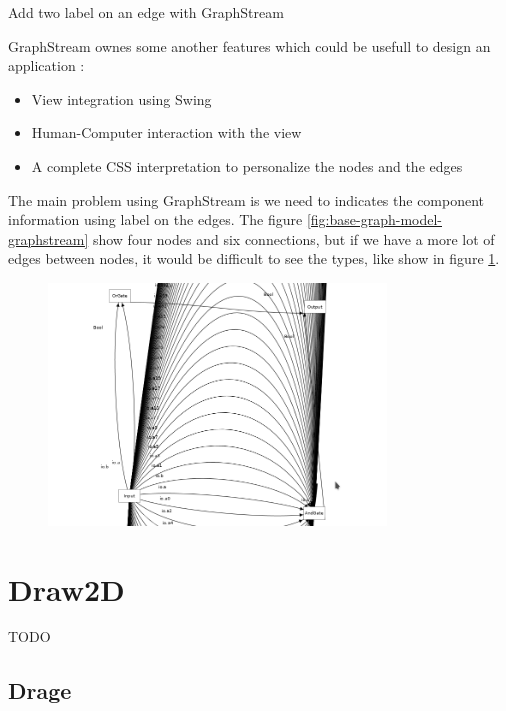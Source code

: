 \begin{listing}[h] %
    \centering
    \caption{Add two label on an edge with GraphStream}
    \label{lst:graphstream-edge-sprite}
\end{listing} %


GraphStream ownes some another features which could be usefull to design an application :
\begin{itemize}
    \item View integration using Swing
    \item Human-Computer interaction with the view
    \item A complete CSS interpretation to personalize the nodes and the edges
\end{itemize}

The main problem using GraphStream is we need to indicates the component information using label on the edges. The figure \ref{fig:base-graph-model-graphstream} show four nodes and six connections, but
if we have a more lot of edges between nodes, it would be difficult to see the types, like show in figure \ref{fig:graphstream-lot-of-edges}.

\begin{figure}
    \centering
    \includegraphics[width=0.8\textwidth]{img/graphstream_lot_of_edges}
    \caption[Label on multiple edges using Graphstream]{}
    \label{fig:graphstream-lot-of-edges}
\end{figure}



\section{Draw2D} %
\label{sec:Draw2D}

TODO

\subsection{Drage}



